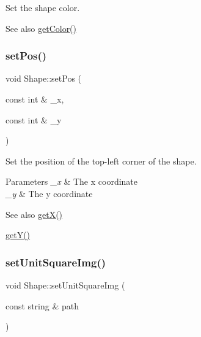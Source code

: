 Set the shape color. 

\begin{DoxySeeAlso}{See also}
\mbox{\hyperlink{class_shape_a6ab685fc0e6aeec5d2e9743f5ecd66a4}{get\+Color()}} 
\end{DoxySeeAlso}
\mbox{\label{class_shape_aa743a709f100d8e17b3bb577d4697480}} 
\subsubsection{\texorpdfstring{set\+Pos()}{setPos()}}
{\footnotesize\ttfamily void Shape\+::set\+Pos (\begin{DoxyParamCaption}\item[{const int \&}]{\+\_\+x,  }\item[{const int \&}]{\+\_\+y }\end{DoxyParamCaption})\hspace{0.3cm}{\ttfamily [inline]}}



Set the position of the top-\/left corner of the shape. 


\begin{DoxyParams}{Parameters}
{\em \+\_\+x} & The x coordinate \\
\hline
{\em \+\_\+y} & The y coordinate \\
\hline
\end{DoxyParams}
\begin{DoxySeeAlso}{See also}
\mbox{\hyperlink{class_shape_af604de36aa616c585bb30dedf5e5c68b}{get\+X()}} 

\mbox{\hyperlink{class_shape_a2e87ea4122381ffb83474f4b69247ded}{get\+Y()}} 
\end{DoxySeeAlso}
\mbox{\label{class_shape_a0d022da031906acd13be90c3fb3db643}} 
\subsubsection{\texorpdfstring{set\+Unit\+Square\+Img()}{setUnitSquareImg()}}
{\footnotesize\ttfamily void Shape\+::set\+Unit\+Square\+Img (\begin{DoxyParamCaption}\item[{const string \&}]{path }\end{DoxyParamCaption})\hspace{0.3cm}{\ttfamily [inline]}}



